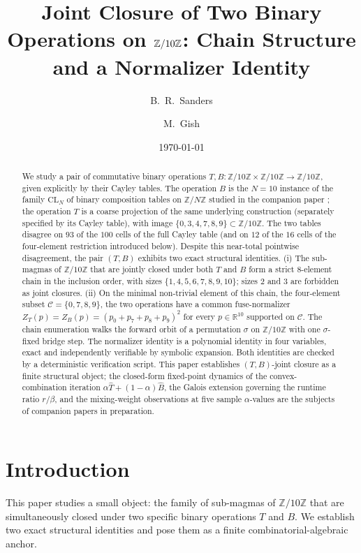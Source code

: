 \documentclass[11pt,reqno]{amsart}
\title[Joint Closure on $\Zten$]{Joint Closure of Two Binary Operations on $\Zten$:
Chain Structure and a Normalizer Identity}
\author{B.~R.~Sanders}
\author{M.~Gish}
\date{\today}
\theoremstyle{plain}
\theoremstyle{definition}
\theoremstyle{remark}
\newcommand{\Z}{\mathbb{Z}}
\newcommand{\R}{\mathbb{R}}
\newcommand{\Zten}{\Z/10\Z}
\newcommand{\Cfour}{\mathcal{C}}
\newcommand{\fuseT}{\widehat{T}}
\newcommand{\fuseB}{\widehat{B}}
\newcommand{\CL}{\mathrm{CL}}
\begin{document}
\begin{abstract}
We study a pair of commutative binary operations
$T,B:\Zten\times\Zten\to\Zten$, given explicitly by their Cayley
tables. The operation $B$ is the $N=10$ instance of the family
$\CL_{N}$ of binary composition tables on $\Z/N\Z$ studied in the
companion paper \cite{SandersGish2026Sigma}; the operation $T$ is
a coarse projection of the same underlying construction
(separately specified by its Cayley table), with image
$\{0,3,4,7,8,9\}\subset\Zten$. The two tables disagree on $93$
of the $100$ cells of the full Cayley table (and on $12$ of the
$16$ cells of the four-element restriction introduced below). Despite this near-total pointwise disagreement,
the pair $(T,B)$ exhibits two exact structural identities. (i) The
sub-magmas of $\Zten$ that are jointly closed under both $T$ and
$B$ form a strict $8$-element chain in the inclusion order, with
sizes $\{1,4,5,6,7,8,9,10\}$; sizes $2$ and $3$ are forbidden as
joint closures. (ii) On the minimal non-trivial element of this
chain, the four-element subset $\Cfour=\{0,7,8,9\}$, the two
operations have a common fuse-normalizer
$Z_{T}(p)=Z_{B}(p)=(p_{0}+p_{7}+p_{8}+p_{9})^{2}$ for every
$p\in\R^{10}$ supported on $\Cfour$. The chain enumeration walks
the forward orbit of a permutation $\sigma$ on $\Zten$ with one
$\sigma$-fixed bridge step. The normalizer identity is a
polynomial identity in four variables, exact and independently
verifiable by symbolic expansion. Both identities are checked by a
deterministic verification script. This paper establishes
$(T,B)$-joint closure as a finite structural object; the
closed-form fixed-point dynamics of the convex-combination
iteration $\alpha\fuseT+(1-\alpha)\fuseB$, the Galois extension
governing the runtime ratio $r/\beta$, and the mixing-weight
observations at five sample $\alpha$-values are the subjects of
companion papers in preparation.
\end{abstract}

\maketitle

\section{Introduction}\label{sec:intro}

This paper studies a small object: the family of sub-magmas of
$\Zten$ that are simultaneously closed under two specific binary
operations $T$ and $B$. We establish two exact structural
identities and pose them as a finite combinatorial-algebraic
anchor.
\end{document}
